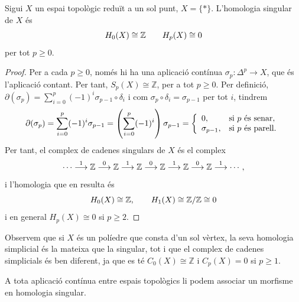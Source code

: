 \documentclass[../main.tex]{subfiles}
\begin{document}
\begin{ter}
Sigui $X$ un espai topològic reduït a un sol punt, $X = \{*\}$. L'homologia singular de $X$ és 
\begin{equation}
    \notag
    H_0(X)\cong \mathbb{Z}\qquad H_p(X)\cong 0
\end{equation}
per tot $p\geq0$.
\end{ter}
\begin{proof}
Per a cada $p\geq 0$, només hi ha una aplicació contínua $\sigma_p:\Delta^p\rightarrow X$, que és l'aplicació contant. Per tant, $S_p(X)\cong \mathbb{Z}$, per a tot $p\geq 0$. Per definició, $\partial(\sigma_p)=\sum_{i=0}^p(-1)^{i}\sigma_{p-1}\circ\delta_i$ i com $\sigma_p\circ\delta_i = \sigma_{p-1}$ per tot $i$, tindrem
\begin{equation}
    \notag
    \partial(\sigma_p) = \sum_{i=0}^p(-1)^{i}\sigma_{p-1} = \left(\sum_{i=0}^p(-1)^{i}\right)\sigma_{p-1} = \left\{
    \begin{array}{ll}
        0, & \text{si $p$ és senar}, \\
        \sigma_{p-1}, & \text{si $p$ és parell}.
    \end{array}
    \right.
\end{equation}
Per tant, el complex de cadenes singulars de $X$ és el complex
\begin{equation}
    \notag
    \cdots \overset{1}{\longrightarrow}\mathbb{Z}\overset{0}{\longrightarrow}\mathbb{Z}\overset{1}{\longrightarrow}\mathbb{Z}\overset{0}{\longrightarrow}\mathbb{Z}\overset{1}{\longrightarrow}\mathbb{Z}\overset{0}{\longrightarrow}\mathbb{Z}\overset{1}{\longrightarrow}\cdots,
\end{equation}
i l'homologia que en resulta és
\begin{equation}
    \notag
    H_0(X)\cong \mathbb{Z},\qquad H_1(X)\cong \mathbb{Z}/\mathbb{Z}\cong 0    
\end{equation}
i en general $H_p(X)\cong 0$ si $p\geq 2$.
\end{proof}


Observem que si $X$ és un políedre que consta d'un sol vèrtex, la seva homologia simplicial és la mateixa que la singular, tot i que el complex de cadenes simplicials és ben diferent, ja que es té $C_0(X)\cong\mathbb{Z}$ i $C_p(X) = 0$ si $p\geq 1$.

A tota aplicació contínua entre espais topològics li podem associar un morfisme en homologia singular.
\end{document}
